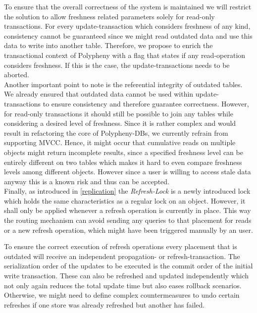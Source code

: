 To ensure that the overall correctness of the system is maintained we will restrict the solution to allow freshness related parameters solely
for read-only transactions. For every update-transaction which considers freshness of any kind, consistency cannot be guaranteed since we might read outdated data
and use this data to write into another table. Therefore, we propose to enrich  the transactional context of Polypheny with a flag that states if any read-operation 
considers freshness. If this is the case, the update-transactions needs to be aborted.\\


Another important point to note is the referential integrity of outdated tables. We already ensured that outdated data cannot be used within update-transactions to 
ensure consistency and therefore guarantee correctness. However, for read-only transactions it should still be possible to join any tables while considering 
a desired level of freshness. 
Since it is rather complex and would result in refactoring the core of Polypheny-DBs, we currently refrain from supporting MVCC.
Hence, it might occur that cumulative reads on multiple objects might return incomplete results, since a specified freshness
level can be entirely different on two tables which makes it hard to even compare freshness levels among different objects. However since a user is willing to access 
stale data anyway this is a known risk and thus can be accepted.\\

Finally, as introduced in \ref{replication} the \emph{Refresh-Lock} is a newly introduced lock which holds the same characteristics as a regular lock on an object.
However, it shall only be applied whenever a refresh operation is currently in place. This way the routing mechanism can avoid sending any queries to that placement
for reads or a new refresh operation, which might have been triggered manually by an user.

To ensure the correct execution of refresh operations every placement that is outdated will receive an independent propagation- or refresh-transaction.
The serialization order of the updates to be executed is the commit order of the initial write transaction.
These can also be refreshed and updated independently which not only again reduces the total update time but also eases rollback scenarios.
Otherwise, we might need to define complex countermeasures to undo certain refreshes if one store was already refreshed but another has failed.

